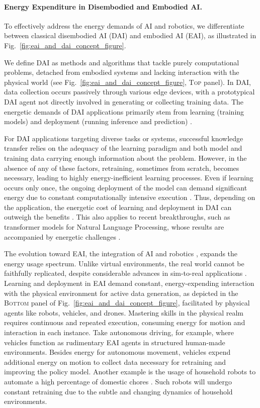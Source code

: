 \documentclass[12pt]{article}
\begin{document}
\paragraph*{Energy Expenditure in Disembodied and Embodied AI.} To effectively address the energy demands of AI and robotics, we differentiate between classical disembodied AI (DAI) and embodied AI (EAI), as illustrated in Fig.~\ref{fig:eai_and_dai_concept_figure}.

We define DAI as methods and algorithms that tackle purely computational problems, detached from embodied systems and lacking interaction with the physical world (see Fig.~\ref{fig:eai_and_dai_concept_figure}, \textsc{Top} panel). In DAI, data collection occurs passively through various edge devices, with a prototypical DAI agent not directly involved in generating or collecting training data. The energetic demands of DAI applications primarily stem from learning (training models) and deployment (running inference and prediction) \cite{Vries2023growingenergyfootprint}.

For DAI applications targeting diverse tasks or systems, successful knowledge transfer relies on the adequacy of the learning paradigm and both model and training data carrying enough information about the problem. However, in the absence of any of these factors, retraining, sometimes from scratch, becomes necessary, leading to highly energy-inefficient learning processes. Even if learning occurs only once, the ongoing deployment of the model can demand significant energy due to constant computationally intensive execution \cite{Vries2023growingenergyfootprint}. Thus, depending on the application, the energetic cost of learning and deployment in DAI can outweigh the benefits \cite{Strubell2019EnergyPolicyConsiderations}. This also applies to recent breakthroughs, such as transformer models for Natural Language Processing, whose results are accompanied by energetic challenges \cite{Cao2020TowardsAccurateReliable}.

The evolution toward EAI, the integration of AI and robotics \cite{Pfeifer2004Embodiedartificialintelligence}, expands the energy usage spectrum. Unlike virtual environments, the real world cannot be faithfully replicated, despite considerable advances in sim-to-real applications \cite{Chebotar2019Closingsimreal}. Learning and deployment in EAI demand constant, energy-expending interaction with the physical environment for active data generation, as depicted in the \textsc{Bottom} panel of Fig.~\ref{fig:eai_and_dai_concept_figure}, facilitated by physical agents like robots, vehicles, and drones. Mastering skills in the physical realm requires continuous and repeated execution, consuming energy for motion and interaction in each instance. Take autonomous driving, for example, where vehicles function as rudimentary EAI agents in structured human-made environments. Besides energy for autonomous movement, vehicles expend additional energy on motion to collect data necessary for retraining and improving the policy model. Another example is the usage of household robots to automate a high percentage of domestic chores \cite{Lehdonvirta2022futuresunpaidwork}. Such robots will undergo constant retraining due to the subtle and changing dynamics of household environments.
\end{document}
